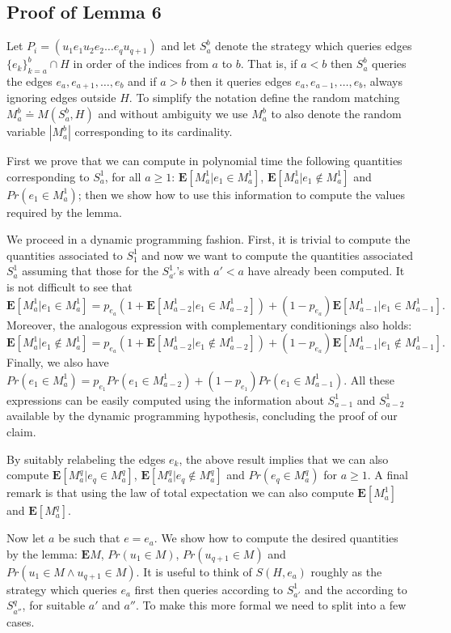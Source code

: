 \documentclass[12pt]{article}
\newcommand{\E}[1]{\mathbf{E}\left[#1\right]}
\newcommand{\Ep}[1]{\mathbf{E}#1}
\begin{document}
	\subsection{Proof of Lemma 6}
	
	Let $P_i = (u_1 e_1 u_2 e_2 \ldots e_q u_{q+1})$ and let $S_a^b$ denote the strategy which queries edges $\{e_k\}_{k = a}^b \cap H$ in order of the indices from $a$ to $b$. That is, if $a < b$ then $S_a^b$ queries the edges $e_a, e_{a + 1}, \ldots, e_b$ and if $a > b$ then it queries edges $e_a, e_{a - 1}, \ldots, e_b$, always ignoring edges outside $H$. To simplify the notation define the random matching $M_a^b \doteq M(S_a^b, H)$ and without ambiguity we use $M_a^b$ to also denote the random variable $|M_a^b|$ corresponding to its cardinality. 
	
	First we prove that we can compute in polynomial time the following quantities corresponding to $S_a^1$, for all $a \ge 1$: $\E{M_a^1|e_1 \in M_a^1}$, $\E{M_a^1|e_1 \notin M_a^1}$ and $Pr(e_1 \in M_a^1)$; then we show how to use this information to compute the values required by the lemma. 
	
	We proceed in a dynamic programming fashion. First, it is trivial to compute the quantities associated to $S_1^1$ and now we want to compute the quantities associated $S_a^1$ assuming that those for the $S_{a'}^1$'s with $a' < a$ have already been computed. It is not difficult to see that $$\E{M_a^1 \Big|e_1 \in M_a^1} = p_{e_a} \left(1 + \E{M_{a - 2}^1 \Big| e_1 \in M_{a - 2}^1}\right) + \left(1 - p_{e_a}\right) \E{M_{a - 1}^1 \Big| e_1 \in M_{a - 1}^1}.$$ Moreover, the analogous expression with complementary conditionings also holds: $$\E{M_a^1 \Big|e_1 \notin M_a^1} = p_{e_a} \left(1 + \E{M_{a - 2}^1 \Big| e_1 \notin M_{a - 2}^1}\right) + \left(1 - p_{e_a}\right) \E{M_{a - 1}^1 \Big| e_1 \notin M_{a - 1}^1}.$$ Finally, we also have $Pr(e_1 \in M_a^1) = p_{e_1} Pr(e_1 \in M_{a - 2}^1) + (1 - p_{e_1}) Pr(e_1 \in M_{a - 1}^1)$. All these expressions can be easily computed using the information about $S_{a-1}^1$ and $S_{a-2}^1$ available by the dynamic programming hypothesis, concluding the proof of our claim. 
	
	By suitably relabeling the edges $e_k$, the above result implies that we can also compute $\E{M_a^q|e_q \in M_a^q}$, $\E{M_a^q|e_q \notin M_a^q}$ and $Pr(e_q \in M_a^q)$ for $a \ge 1$. A final remark is that using the law of total expectation we can also compute $\E{M_a^1}$ and $\E{M_a^q}$.
	
	Now let $a$ be such that $e = e_a$. We show how to compute the desired quantities by the lemma: $\Ep{M}$, $Pr(u_1 \in M)$, $Pr(u_{q + 1} \in M)$ and $Pr(u_1 \in M \wedge u_{q + 1} \in M)$. It is useful to think of $S(H, e_a)$ roughly as the strategy which queries $e_a$ first then queries according to $S_{a'}^1$ and the according to $S_{a''}^q$, for suitable $a'$ and $a''$.	To make this more formal we need to split into a few cases.
	
\end{document}
